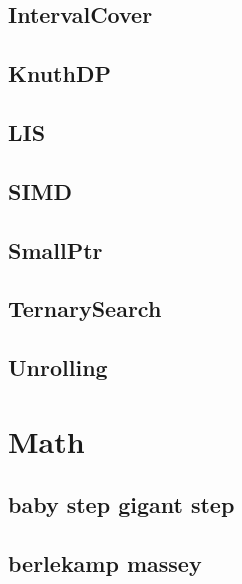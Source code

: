 \subsection{IntervalCover}
\raggedbottom
\hrulefill
\subsection{KnuthDP}
\raggedbottom
\hrulefill
\subsection{LIS}
\raggedbottom
\hrulefill
\subsection{SIMD}
\raggedbottom
\hrulefill
\subsection{SmallPtr}
\raggedbottom
\hrulefill
\subsection{TernarySearch}
\raggedbottom
\hrulefill
\subsection{Unrolling}
\raggedbottom
\hrulefill

\section{Math}
\subsection{baby step gigant step}
\raggedbottom
\hrulefill
\subsection{berlekamp massey}
\raggedbottom
\hrulefill
